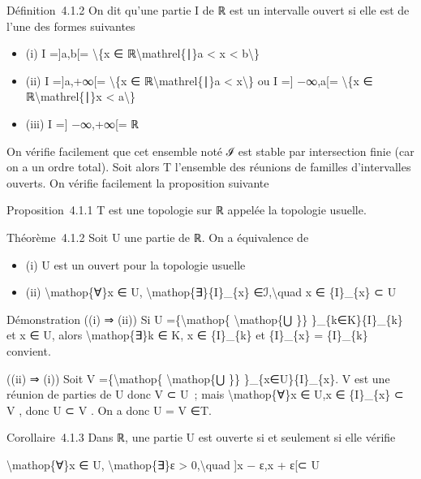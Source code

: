 \documentclass[]{article}
\begin{document}
Définition~4.1.2 On dit qu'une partie I de ℝ est un intervalle ouvert si
elle est de l'une des formes suivantes

\begin{itemize}
\itemsep1pt\parskip0pt
\item
  (i) I ={]}a,b{[}= \textbackslash{}\{x ∈ ℝ\textbackslash{}mathrel\{∣\}a
  \textless{} x \textless{} b\textbackslash{}\}
\item
  (ii) I ={]}a,+∞{[}= \textbackslash{}\{x ∈
  ℝ\textbackslash{}mathrel\{∣\}a \textless{} x\textbackslash{}\} ou I
  ={]} −∞,a{[}= \textbackslash{}\{x ∈ ℝ\textbackslash{}mathrel\{∣\}x
  \textless{} a\textbackslash{}\}
\item
  (iii) I ={]} −∞,+∞{[}= ℝ
\end{itemize}

On vérifie facilement que cet ensemble noté ℐ est stable par
intersection finie (car on a un ordre total). Soit alors T l'ensemble
des réunions de familles d'intervalles ouverts. On vérifie facilement la
proposition suivante

Proposition~4.1.1 T est une topologie sur ℝ appelée la topologie
usuelle.

Théorème~4.1.2 Soit U une partie de ℝ. On a équivalence de

\begin{itemize}
\itemsep1pt\parskip0pt
\item
  (i) U est un ouvert pour la topologie usuelle
\item
  (ii) \textbackslash{}mathop\{∀\}x ∈ U,
  \textbackslash{}mathop\{∃\}\{I\}\_\{x\} ∈ℐ,\textbackslash{}quad x ∈
  \{I\}\_\{x\} ⊂ U
\end{itemize}

Démonstration ((i) ⇒ (ii)) Si U =\{\textbackslash{}mathop\{
\textbackslash{}mathop\{⋃ \}\} \}\_\{k∈K\}\{I\}\_\{k\} et x ∈ U, alors
\textbackslash{}mathop\{∃\}k ∈ K, x ∈ \{I\}\_\{k\} et \{I\}\_\{x\} =
\{I\}\_\{k\} convient.

((ii) ⇒ (i)) Soit V =\{\textbackslash{}mathop\{
\textbackslash{}mathop\{⋃ \}\} \}\_\{x∈U\}\{I\}\_\{x\}. V est une
réunion de parties de U donc V ⊂ U~; mais \textbackslash{}mathop\{∀\}x ∈
U,x ∈ \{I\}\_\{x\} ⊂ V , donc U ⊂ V . On a donc U = V ∈T.

Corollaire~4.1.3 Dans ℝ, une partie U est ouverte si et seulement si
elle vérifie

\textbackslash{}mathop\{∀\}x ∈ U, \textbackslash{}mathop\{∃\}ε
\textgreater{} 0,\textbackslash{}quad {]}x − ε,x + ε{[}⊂ U
\end{document}
